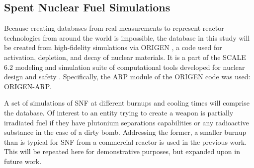 \subsection{Spent Nuclear Fuel Simulations}
\label{sec:snfsim}

Because creating databases from real measurements to represent reactor
technologies from around the world is impossible, the database in this study
will be created from high-fidelity simulations via \gls{ORIGEN} \cite{origen},
a code used for activation, depletion, and decay of nuclear materials. It is a
part of the \gls{SCALE} 6.2 modeling and simulation suite of computational
tools developed for nuclear design and safety \cite{scale}. Specifically, the
ARP module of the ORIGEN code was used: \gls{ORIGEN-ARP}.

A set of simulations of \gls{SNF} at different burnups and cooling times will
comprise the database.  Of interest to an entity trying to create a weapon is
partially irradiated fuel if they have plutonium separations capabilities or
any radioactive substance in the case of a dirty bomb.  Addressing the former,
a smaller burnup than is typical for \gls{SNF} from a commercial reactor is
used in the previous work. This will be repeated here for demonstrative
purposes, but expanded upon in future work.

